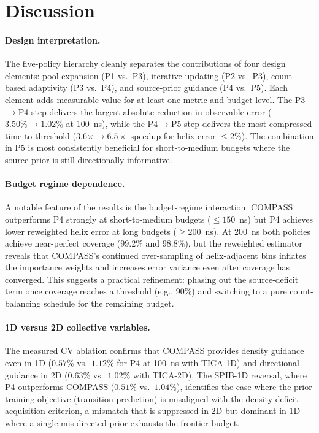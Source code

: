 \section{Discussion}

\paragraph{Design interpretation.}
The five-policy hierarchy cleanly separates the contributions of four design elements: pool expansion (P1 vs.\ P3), iterative updating (P2 vs.\ P3), count-based adaptivity (P3 vs.\ P4), and source-prior guidance (P4 vs.\ P5).
Each element adds measurable value for at least one metric and budget level.
The P3$\to$P4 step delivers the largest absolute reduction in observable error ($3.50\%\to1.02\%$ at 100~ns), while the P4$\to$P5 step delivers the most compressed time-to-threshold ($3.6\times\to6.5\times$ speedup for helix error $\leq 2\%$).
The combination in P5 is most consistently beneficial for short-to-medium budgets where the source prior is still directionally informative.

\paragraph{Budget regime dependence.}
A notable feature of the results is the budget-regime interaction: COMPASS outperforms P4 strongly at short-to-medium budgets ($\leq 150$~ns) but P4 achieves lower reweighted helix error at long budgets ($\geq 200$~ns).
At 200~ns both policies achieve near-perfect coverage ($99.2\%$ and $98.8\%$), but the reweighted estimator reveals that COMPASS's continued over-sampling of helix-adjacent bins inflates the importance weights and increases error variance even after coverage has converged.
This suggests a practical refinement: phasing out the source-deficit term once coverage reaches a threshold (e.g., 90\%) and switching to a pure count-balancing schedule for the remaining budget.

\paragraph{1D versus 2D collective variables.}
The measured CV ablation confirms that COMPASS provides density guidance even in 1D ($0.57\%$ vs.\ $1.12\%$ for P4 at 100~ns with TICA-1D) and directional guidance in 2D ($0.63\%$ vs.\ $1.02\%$ with TICA-2D).
The SPIB-1D reversal, where P4 outperforms COMPASS ($0.51\%$ vs.\ $1.04\%$), identifies the case where the prior training objective (transition prediction) is misaligned with the density-deficit acquisition criterion, a mismatch that is suppressed in 2D but dominant in 1D where a single mis-directed prior exhausts the frontier budget.

